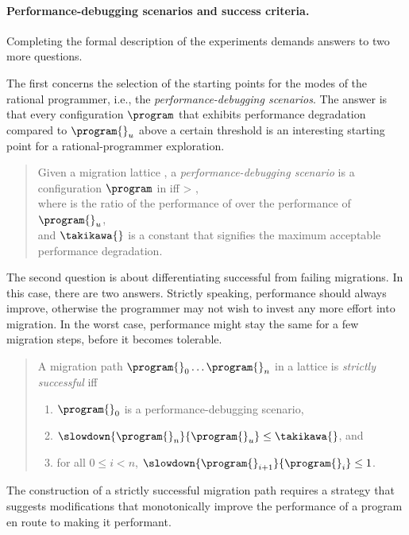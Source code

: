 \paragraph{Performance-debugging scenarios and success criteria.} Completing the
formal description of the experiments demands answers to two more questions.

The first concerns the selection of the starting points for the modes of the
rational programmer, i.e., the \emph{performance-debugging scenarios}.  The
answer is that every configuration $\program$ that exhibits performance
degradation compared to $\program{}_u$ above a certain threshold is an
interesting starting point for a rational-programmer exploration.

\begin{quote} \em

Given a migration lattice ,
a \emph{performance-debugging scenario} is a configuration $\program$ in  
iff
 > \takikawa{},\\
 where  is the ratio of the performance of \program{} over the performance of $\program{}_u$,\\ 
 and $\takikawa{}$ is a constant that signifies the maximum acceptable performance degradation.
\end{quote}

The second question is about differentiating successful from failing migrations.
In this case, there are two answers. Strictly speaking, performance should
always improve, otherwise the programmer may not wish to invest any more effort
into migration.  In the worst case, performance might stay the same for a few
migration steps, before it becomes tolerable.

\begin{quote} \em

A migration path ${\program{}_0} \ldots {\program{}_n}$ in a lattice 
is \emph{strictly successful}
iff
\begin{enumerate}
  \item $\program{}_0$ is a performance-debugging scenario,
  \item $\slowdown{\program{}_n}{\program{}_u} \leq \takikawa{}$, and 
  \item for all $0 \leq i < n$, $\slowdown{\program{}_{i+1}}{\program{}_{i}} \leq 1$.
 \end{enumerate} 
\end{quote}
The construction of a strictly successful migration path requires a strategy
that suggests modifications that monotonically improve the performance of  a
program en route to making it performant.


